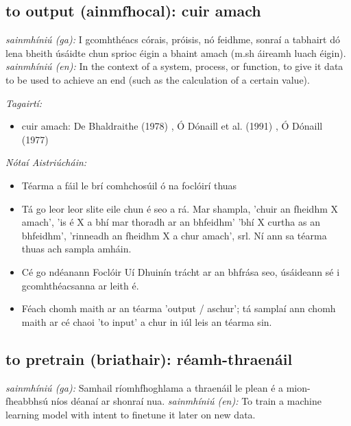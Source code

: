 \documentclass{article}
\begin{document}
\subsection*{to output (ainmfhocal): cuir amach} 
 \noindent \textit{sainmhíniú (ga):} I gcomhthéacs córais, próisis, nó feidhme, sonraí a tabhairt dó lena bheith úsáidte chun sprioc éigin a bhaint amach (m.sh áireamh luach éigin).
\newline\newline
 \noindent \textit{sainmhíniú (en):} In the context of a system, process, or function, to give it data to be used to achieve an end (such as the calculation of a certain value).
\newline

 \noindent \textit{Tagairtí:}
\begin{itemize}
	\item cuir amach: De Bhaldraithe (1978) \cite{de-bhaldraithe}, Ó Dónaill et al. (1991) \cite{focloir-beag}, Ó Dónaill (1977) \cite{odonaill}
\end{itemize}

 \noindent \textit{Nótaí Aistriúcháin:}
\begin{itemize}
	\item Téarma a fáil le brí comhchosúil ó na foclóirí thuas
	\item Tá go leor leor slite eile chun é seo a rá. Mar shampla, 'chuir an fheidhm X amach', 'is é X a bhí mar thoradh ar an bhfeidhm' 'bhí X curtha as an bhfeidhm', 'rinneadh an fheidhm X a chur amach', srl. Ní ann sa téarma thuas ach sampla amháin.
	\item Cé go ndéanann Foclóir Uí Dhuinín trácht ar an bhfrása seo, úsáideann sé i gcomhthéacsanna ar leith é.
	\item Féach chomh maith ar an téarma 'output / aschur'; tá samplaí ann chomh maith ar cé chaoi 'to input' a chur in iúl leis an téarma sin.
\end{itemize}


\subsection*{to pretrain (briathair): réamh-thraenáil} 
 \noindent \textit{sainmhíniú (ga):} Samhail ríomhfhoghlama a thraenáil le plean é a mion-fheabbhsú níos déanaí ar shonraí nua.
\newline\newline
 \noindent \textit{sainmhíniú (en):} To train a machine learning model with intent to finetune it later on new data.
\newline
\end{document}
